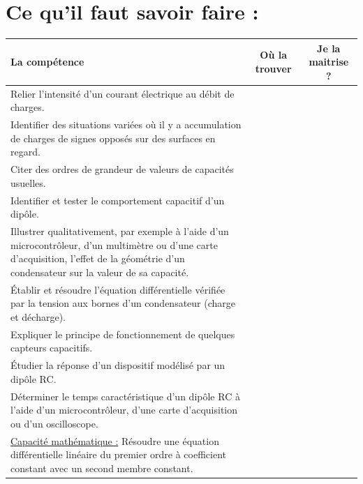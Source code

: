 \documentclass[a4paper,12pt]{article}
\begin{document}
\section*{Ce qu'il faut savoir faire :}
\begin{table}[h!]
	\begin{tabular}{|m{12cm}|c|c|}
		\hline \rowcolor{gray!20}\centering \textbf{La compétence }& \textbf{Où la trouver}& \textbf{Je la maitrise ?}\\
		\hline Relier l'intensité d'un courant électrique au débit de charges. & &\\
		\hline Identifier des situations variées où il y a accumulation de charges de signes opposés sur des surfaces en regard. & & \\
		\hline Citer des ordres de grandeur de valeurs de capacités usuelles. & &\\
		\hline Identifier et tester le comportement capacitif d'un dipôle. &&\\
		\hline Illustrer qualitativement, par exemple à l'aide d'un microcontrôleur, d'un multimètre ou d'une carte d'acquisition, l'effet de la géométrie d'un condensateur sur la valeur de sa capacité.&&\\
		\hline Établir et résoudre l'équation différentielle vérifiée par la tension aux bornes d'un condensateur (charge et décharge).&&\\
		\hline Expliquer le principe de fonctionnement de quelques capteurs capacitifs.&&\\
		\hline Étudier la réponse d'un dispositif modélisé par un dipôle RC.&&\\
		\hline Déterminer le temps caractéristique d'un dipôle RC à l'aide d'un microcontrôleur, d'une carte d'acquisition ou d'un oscilloscope.&&\\
		\hline \underline{Capacité mathématique :} Résoudre une équation différentielle linéaire du premier ordre à coefficient constant avec un second membre constant.&&\\
		\hline
	\end{tabular}
\end{table}
\end{document}
